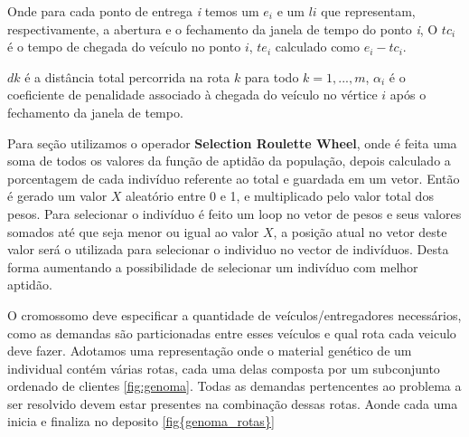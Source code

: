 Onde para cada ponto de entrega \textit{i} temos um \(e_i\)
e um \(li\)  que representam, respectivamente, a abertura e o fechamento
da janela de tempo do ponto \textit{i}, O \(tc_i\) é o tempo de chegada do veículo no ponto \(i\), \(te_i\) calculado como \(e_i - tc_i\). 

\(dk\) é a distância total percorrida na rota $k$ para todo $k=1,...,m$, \(\alpha_i\) é o coeficiente de penalidade associado à chegada do veículo no vértice $i$ após o fechamento da janela de tempo.

Para seção utilizamos o operador \textbf{Selection Roulette Wheel}, onde é feita uma soma de todos os valores da função de aptidão da população, depois calculado a porcentagem de cada indivíduo referente ao total e guardada em um vetor. Então é gerado um valor $X$ aleatório entre 0 e 1, e multiplicado pelo valor total dos pesos. 
Para selecionar o indivíduo é feito um loop no vetor de pesos e seus valores somados até que seja menor ou igual ao valor $X$, a posição atual no vetor deste valor será o utilizada para selecionar o individuo no vector de indivíduos. 
Desta forma aumentando a possibilidade de selecionar um indivíduo com melhor aptidão.

O cromossomo deve especificar a quantidade de veículos/entregadores necessários, como as demandas são particionadas entre esses veículos e qual rota cada veiculo deve fazer. Adotamos uma representação onde o material genético de um individual contém várias rotas, cada uma delas composta por um subconjunto ordenado de clientes \ref{fig:genoma}. Todas as demandas pertencentes ao problema a ser resolvido devem estar presentes na combinação dessas rotas. Aonde cada uma inicia e finaliza no deposito \ref{fig{genoma_rotas}}

\begin{center}
	\label{fig:genoma}
\end{center}

\begin{center}
	\label{fig:genoma_rotas}
\end{center}

